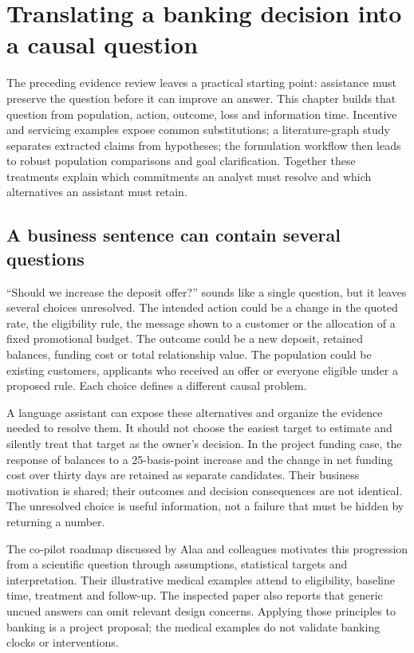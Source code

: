 \chapter{Translating a banking decision into a causal question}
\label{la:translation}

The preceding evidence review leaves a practical starting point: assistance
must preserve the question before it can improve an answer. This chapter
builds that question from population, action, outcome, loss and information
time. Incentive and servicing examples expose common substitutions; a
literature-graph study separates extracted claims from hypotheses; the
formulation workflow then leads to robust population comparisons and goal
clarification. Together these treatments explain which commitments an analyst
must resolve and which alternatives an assistant must retain.

\section{A business sentence can contain several questions}

``Should we increase the deposit offer?'' sounds like a single question, but
it leaves several choices unresolved. The intended action could be a change
in the quoted rate, the eligibility rule, the message shown to a customer or
the allocation of a fixed promotional budget. The outcome could be a new
deposit, retained balances, funding cost or total relationship value. The
population could be existing customers, applicants who received an offer or
everyone eligible under a proposed rule. Each choice defines a different
causal problem.

A language assistant can expose these alternatives and organize the evidence
needed to resolve them. It should not choose the easiest target to estimate
and silently treat that target as the owner's decision. In the project funding
case, the response of balances to a 25-basis-point increase and the change in
net funding cost over thirty days are retained as separate candidates. Their
business motivation is shared; their outcomes and decision consequences are
not identical. The unresolved choice is useful information, not a failure
that must be hidden by returning a number.

The co-pilot roadmap discussed by Alaa and colleagues motivates this progression
from a scientific question through assumptions, statistical targets and
interpretation. Their illustrative medical examples attend to eligibility,
baseline time, treatment and follow-up. The inspected paper also reports that
generic uncued answers can omit relevant design concerns. Applying those
principles to banking is a project proposal; the medical examples do not
validate banking clocks or interventions. \citep{v12_la_2407_19118}


